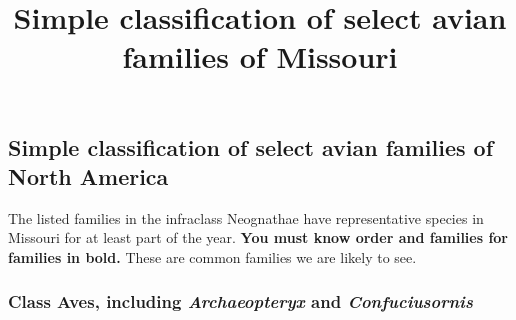\documentclass[10pt]{article}
\title{Simple classification of select avian families of Missouri}
\date{}                                           %
\newlength\onelength
\begin{document}
\thispagestyle{plain}

\subsection*{Simple classification of select avian families of North America}

The listed families in the infraclass Neognathae have representative species in Missouri for at least part of the year. \textbf{You must know order and families for families in bold.} These are common families we are likely to see.

\subsubsection*{Class Aves, including \textit{Archaeopteryx} and \textit{Confuciusornis}}
\end{document}
